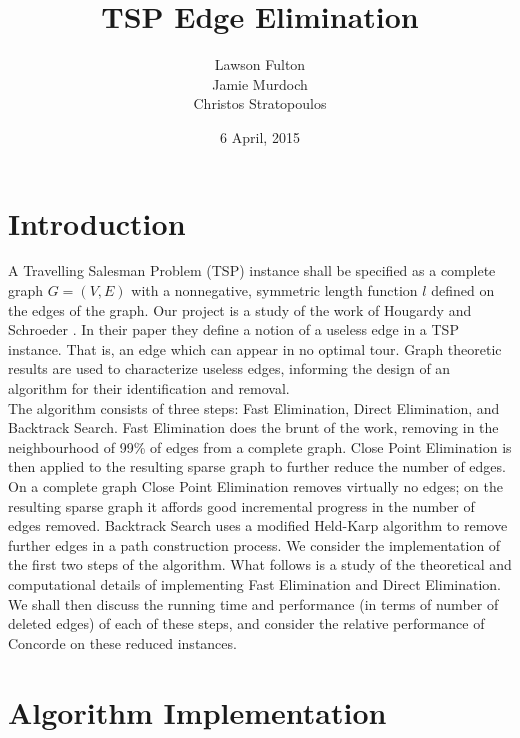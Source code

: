 \documentclass{article} \usepackage[left=2cm,top=1.5cm,right=2cm,
\DeclareRobustCommand\{{\ifmmode\lbrace\else\textbraceleft\fi}
\DeclareRobustCommand\}{\ifmmode\rbrace\else\textbraceright\fi}
\begin{document}
\title{TSP Edge Elimination} \date{6 April, 2015} \author{Lawson
  Fulton\\ Jamie Murdoch \\ Christos Stratopoulos}
\maketitle

\newpage

\tableofcontents

\newpage

\section{Introduction}

A Travelling Salesman Problem (TSP) instance shall be specified as a
complete graph $G=(V, E)$ with a nonnegative, symmetric length
function $l$ defined on the edges of the graph. Our project is a study
of the work of Hougardy and Schroeder \cite{paper}. In their paper
they define a notion of a useless edge in a TSP instance. That is, an
edge which can appear in no optimal tour. Graph theoretic results are
used to characterize useless edges, informing the design of an
algorithm for their
identification and removal. \\
The algorithm consists of three steps: Fast Elimination, Direct
Elimination, and Backtrack Search. Fast Elimination does the brunt of
the work, removing in the neighbourhood of 99\% of edges from a
complete graph. Close Point Elimination is then applied to the
resulting sparse graph to further reduce the number of edges. On a
complete graph Close Point Elimination removes virtually no edges; on
the resulting sparse graph it affords good incremental progress in the
number of edges removed. Backtrack Search uses a modified Held-Karp
algorithm to remove further edges in a path construction process. We
consider the implementation of the first two steps of the
algorithm. What follows is a study of the theoretical and
computational details of implementing Fast Elimination and Direct
Elimination. We shall then discuss the running time and performance
(in terms of number of deleted edges) of each of these steps, and
consider the relative performance of Concorde on
these reduced instances.

\section{Algorithm Implementation}
\end{document}
